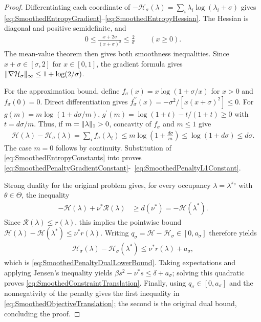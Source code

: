 \documentclass[10pt,a4paper]{amsart}
\def\HH{{\mathcal{H}}}
\def\Reg{{\mathcal{R}}}
\DeclarePairedDelimiter{\norm}{\lVert}{\rVert}
\def\nuOpt{{\nu^{*}}}
\theoremstyle{plain}
\theoremstyle{definition}
\theoremstyle{remark}
\begin{document}
\begin{proof}
 Differentiating each coordinate of
 $-\HH_\sigma(\lambda)=\sum_i\lambda_i\log(\lambda_i+\sigma)$ gives
 \eqref{eq:SmoothedEntropyGradient}--\eqref{eq:SmoothedEntropyHessian}.
 The Hessian is diagonal and positive semidefinite, and
 \begin{align*}
  0\leq\frac{x+2\sigma}{(x+\sigma)^2}\leq\frac{2}{\sigma}
  \qquad(x\geq0).
 \end{align*}
 The mean-value theorem then gives both smoothness inequalities.
 Since $x+\sigma\in[\sigma,2]$ for $x\in[0,1]$, the gradient formula gives
 $\norm{\nabla\HH_\sigma}_\infty\leq1+\log(2/\sigma)$.

 For the approximation bound, define $f_\sigma(x)=x\log(1+\sigma/x)$ for
 $x>0$ and $f_\sigma(0)=0$. Direct differentiation gives
 $f_\sigma^{\prime\prime}(x)=-\sigma^2/[x(x+\sigma)^2]\leq0$. For
 $g(m)=m\log(1+d\sigma/m)$, $g^{\prime}(m)=\log(1+t)-t/(1+t)\geq0$ with
 $t=d\sigma/m$. Thus, if $m=\norm{\lambda}_1>0$, concavity of $f_\sigma$ and
 $m\leq1$ give
 \begin{align*}
  \HH(\lambda)-\HH_\sigma(\lambda)
  =\sum_i f_\sigma(\lambda_i)
  \leq m\log\left(1+\frac{d\sigma}{m}\right)
  \leq\log(1+d\sigma)\leq d\sigma.
 \end{align*}
 The case $m=0$ follows by continuity. Substitution of
 \eqref{eq:SmoothedEntropyConstants} into
  proves
 \mbox{\eqref{eq:SmoothedPenaltyGradientConstant}-
  \eqref{eq:SmoothedPenaltyL1Constant}}.

 Strong duality for the original problem gives, for every occupancy
 $\lambda=\lambda^{\pi_\theta}$ with $\theta\in\Theta$, the inequality
 \begin{align*}
  -\HH(\lambda)+\nuOpt\Reg(\lambda)
   & \geq d(\nuOpt)=-\HH(\lambda^*).
 \end{align*}
 Since $\Reg(\lambda)\leq r(\lambda)$, this implies the pointwise
 bound $\HH(\lambda)-\HH(\lambda^*)\leq\nuOpt r(\lambda)$.
 Writing $q_\sigma=\HH-\HH_\sigma\in[0,a_\sigma]$ therefore yields
 \begin{align*}
  \HH_\sigma(\lambda)-\HH_\sigma(\lambda^*)
  \leq\nuOpt r(\lambda)+a_\sigma,
 \end{align*}
 which is \eqref{eq:SmoothedPenaltyDualLowerBound}. Taking
 expectations and applying Jensen's inequality yields
 $\beta s^2-\nuOpt s\leq\delta+a_\sigma$; solving this quadratic proves
 \eqref{eq:SmoothedConstraintTranslation}. Finally, using
 $q_\sigma\in[0,a_\sigma]$ and the nonnegativity of the penalty gives the
 first inequality in \eqref{eq:SmoothedObjectiveTranslation}; the second
 is the original dual bound, concluding the proof.
\end{proof}
\end{document}
